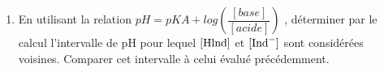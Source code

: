 \documentclass[a4paper,11pt,fleqn]{article}%
\begin{document}
		\begin{enumerate}[resume]
			\item En utilisant la relation $pH = pKA + log\left(\dfrac{[base]}{[acide]}\right)$ , déterminer par le calcul l'intervalle de pH pour lequel
			$[\ce{Hlnd}]$ et $[\ce{Ind-}]$ sont considérées voisines. Comparer cet intervalle à celui évalué précédemment.
		\end{enumerate}
\end{document}
